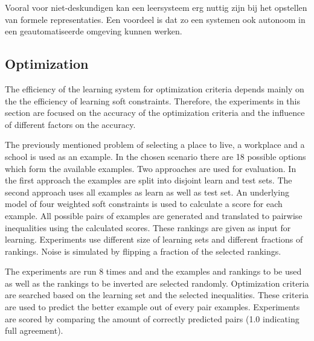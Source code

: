 \documentclass{llncs}
\begin{document}
Vooral voor niet-deskundigen kan een leersysteem erg nuttig zijn bij het opstellen van formele representaties.
Een voordeel is dat zo een systemen ook autonoom in een geautomatiseerde omgeving kunnen werken.

\subsection{Optimization}
The efficiency of the learning system for optimization criteria depends mainly on the the efficiency of learning soft constraints.
Therefore, the experiments in this section are focused on the accuracy of the optimization criteria and the influence of different factors on the accuracy.

The previously mentioned problem of selecting a place to live, a workplace and a school is used as an example.
In the chosen scenario there are 18 possible options which form the available examples.
Two approaches are used for evaluation.
In the first approach the examples are split into disjoint learn and test sets.
The second approach uses all examples as learn as well as test set.
An underlying model of four weighted soft constraints is used to calculate a score for each example.
All possible pairs of examples are generated and translated to pairwise inequalities using the calculated scores.
These rankings are given as input for learning.
Experiments use different size of learning sets and different fractions of rankings.
Noise is simulated by flipping a fraction of the selected rankings.

The experiments are run 8 times and and the examples and rankings to be used as well as the rankings to be inverted are selected randomly.
Optimization criteria are searched based on the learning set and the selected inequalities.
These criteria are used to predict the better example out of every pair examples.
Experiments are scored by comparing the amount of correctly predicted pairs (1.0 indicating full agreement).
\end{document}

